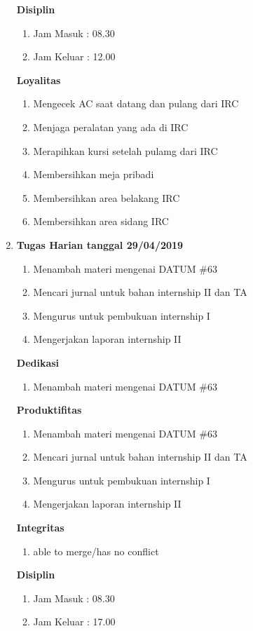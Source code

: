 \begin{enumerate}
\textbf{Disiplin}
\begin{enumerate}
\item Jam Masuk : 08.30
\item Jam Keluar : 12.00
\end{enumerate}

\textbf{Loyalitas}
\begin{enumerate}
\item Mengecek AC saat datang dan pulang dari IRC
\item Menjaga peralatan yang ada di IRC
\item Merapihkan kursi setelah pulamg dari IRC
\item Membersihkan meja pribadi
\item Membersihkan area belakang IRC
\item Membersihkan area sidang IRC
\end{enumerate}


\item \textbf{Tugas Harian tanggal 29/04/2019}
\begin{enumerate}
\item Menambah materi mengenai DATUM \#63
\item Mencari jurnal untuk bahan internship II dan TA
\item Mengurus untuk pembukuan internship I 
\item Mengerjakan laporan internship II
\end{enumerate}

\textbf{Dedikasi}
\begin{enumerate}
\item Menambah materi mengenai DATUM \#63
\end{enumerate}

\textbf{Produktifitas}
\begin{enumerate}
\item Menambah materi mengenai DATUM \#63
\item Mencari jurnal untuk bahan internship II dan TA
\item Mengurus untuk pembukuan internship I 
\item Mengerjakan laporan internship II
\end{enumerate}

\textbf{Integritas}
\begin{enumerate}
\item able to merge/has no conflict
\end{enumerate}

\textbf{Disiplin}
\begin{enumerate}
\item Jam Masuk : 08.30
\item Jam Keluar : 17.00
\end{enumerate}


\end{enumerate}
